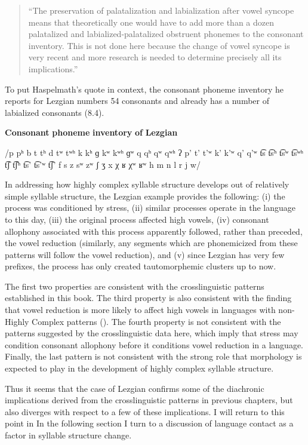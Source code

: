 \begin{quote}
“The preservation of palatalization and labialization after vowel syncope means that theoretically one would have to add more than a dozen palatalized and labialized-palatalized obstruent phonemes to the consonant inventory. This is not done here because the change of vowel syncope is very recent and more research is needed to determine precisely all its implications.”

\citep[38]{Haspelmath1993}
\end{quote}

To put Haspelmath’s quote in context, the consonant phoneme inventory he reports for Lezgian numbers 54 consonants and already has a number of labialized consonants (8.4).

\ea\label{ex:(8.4)}
  \textbf{Consonant} \textbf{phoneme} \textbf{inventory} \textbf{of} \textbf{Lezgian}

/p pʰ b t tʰ d tʷ tʷʰ k kʰ ɡ kʷ kʷʰ ɡʷ q qʰ qʷ qʷʰ ʔ p’ t’ t’ʷ k’ k’ʷ q’ q’ʷ t͡s t͡sʰ t͡sʷ t͡sʷʰ t͡ʃ t͡ʃʰ t͡s’ t͡s’ʷ t͡ʃ’ f s z sʷ zʷ ʃ ʒ x χ ʁ χʷ ʁʷ h m n l r j w/

\z

  In addressing how highly complex syllable structure develops out of relatively simple syllable structure, the Lezgian example provides the following: (i) the process was conditioned by stress, (ii) similar processes operate in the language to this day, (iii) the original process affected high vowels, (iv) consonant allophony associated with this process apparently followed, rather than preceded, the vowel reduction (similarly, any segments which are phonemicized from these patterns will follow the vowel reduction), and (v) since Lezgian has very few prefixes, the process has only created tautomorphemic clusters up to now. 

  The first two properties are consistent with the crosslinguistic patterns established in this book. The third property is also consistent with the finding that vowel reduction is more likely to affect high vowels in languages with non-Highly Complex patterns (). The fourth property is not consistent with the patterns suggested by the crosslinguistic data here, which imply that stress may condition consonant allophony before it conditions vowel reduction in a language. Finally, the last pattern is not consistent with the strong role that morphology is expected to play in the development of highly complex syllable structure.

  Thus it seems that the case of Lezgian confirms some of the diachronic implications derived from the crosslinguistic patterns in previous chapters, but also diverges with respect to a few of these implications. I will return to this point in  In the following section I turn to a discussion of language contact as a factor in syllable structure change.

